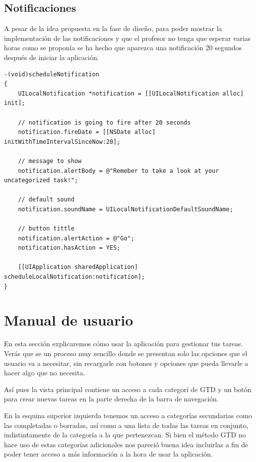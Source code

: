 \documentclass[parskip=half*]{scrartcl}
\begin{document}
\subsection{Notificaciones}

A pesar de la idea propuesta en la fase de dise\~no, para poder mostrar la implementaci\'on de las notificaciones y que el profesor no tenga que esperar varias horas como se propon\'ia se ha hecho que aparezca una notificaci\'on 20 segundos despu\'es de iniciar la aplicaci\'on.

\begin{lstlisting}
-(void)scheduleNotification
{
    UILocalNotification *notification = [[UILocalNotification alloc] init];
    
    // notification is going to fire after 20 seconds
    notification.fireDate = [[NSDate alloc] initWithTimeIntervalSinceNow:20];
    
    // message to show
    notification.alertBody = @"Remeber to take a look at your uncategorized task!";
    
    // default sound
    notification.soundName = UILocalNotificationDefaultSoundName;
    
    // button tittle
    notification.alertAction = @"Go";
    notification.hasAction = YES;
    
    [[UIApplication sharedApplication] scheduleLocalNotification:notification];
}
\end{lstlisting}

\newpage

\section{Manual de usuario}

En esta secci\'on explicaremos c\'omo usar la aplicaci\'on para gestionar tus tareas. Ver\'as que se un proceso muy sencillo donde se presentan solo las opciones que el usuario va a necesitar, sin recargarle con botones y opciones que pueda llevarle a hacer algo que no necesita.

As\'i pues la vista principal contiene un acceso a cada categor\'i de GTD y un bot\'on para crear nuevas tareas en la parte derecha de la barra de navegaci\'on.

En la esquina superior izquierda tenemos un acceso a categor\'ias secundarias como las completadas o borradas, as\'i como a una lista de todas las tareas en conjunto, indistintamente de la categor\'ia a la que pertenezcan. Si bien el m\'etodo GTD no hace uso de estas categor\'ias adicionales nos pareci\'o buena idea incluirlas a fin de poder tener acceso a m\'as informaci\'on a la hora de usar la aplicaci\'on.
\end{document}
